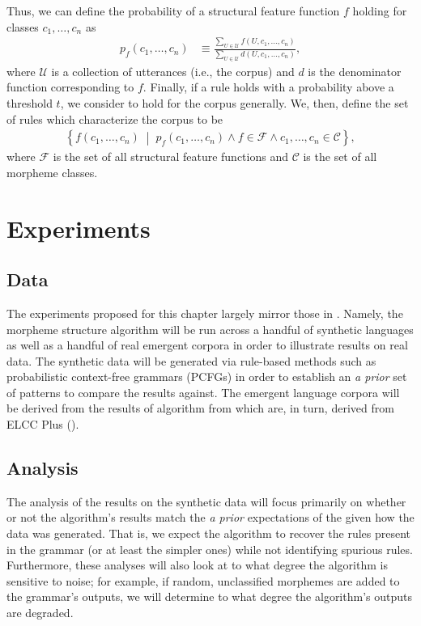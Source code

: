 Thus, we can define the probability of a structural feature function $f$ holding for classes $c_1, \dots, c_n$ as
\begin{align}
  p_f(c_1, \dots, c_n) &\equiv \frac{\sum_{U\in\mathcal U} f(U, c_1, \dots, c_n)}{\sum_{U\in\mathcal U} d(U, c_1, \dots, c_n)}
  ,
\end{align}
where
  $\mathcal U$ is a collection of utterances (i.e., the corpus)
  and $d$ is the denominator function corresponding to $f$.
Finally, if a rule holds with a probability above a threshold $t$, we consider to hold for the corpus generally.
We, then, define the set of rules which characterize the corpus to be
\begin{align}
  \left\{
    f(c_1, \dots, c_n) \; \middle| \;
    p_f(c_1, \dots, c_n) \wedge f \in \mathcal F \wedge c_1, \dots, c_n \in \mathcal C
  \right\}
  ,
\end{align}
where $\mathcal F$ is the set of all structural feature functions and $\mathcal C$ is the set of all morpheme classes.


\section{Experiments}

\subsection{Data}
The experiments proposed for this chapter largely mirror those in .
Namely, the morpheme structure algorithm will be run across a handful of synthetic languages as well as a handful of real emergent corpora in order to illustrate results on real data.
The synthetic data will be generated via rule-based methods such as probabilistic context-free grammars (PCFGs) in order to establish an \emph{a prior} set of patterns to compare the results against.
The emergent language corpora will be derived from the results of algorithm from  which are, in turn, derived from ELCC Plus ().

\subsection{Analysis}

The analysis of the results on the synthetic data will focus primarily on whether or not the algorithm's results match the \emph{a prior} expectations of the given how the data was generated.
That is, we expect the algorithm to recover the rules present in the grammar (or at least the simpler ones) while not identifying spurious rules.
Furthermore, these analyses will also look at to what degree the algorithm is sensitive to noise; for example, if random, unclassified morphemes are added to the grammar's outputs, we will determine to what degree the algorithm's outputs are degraded.

